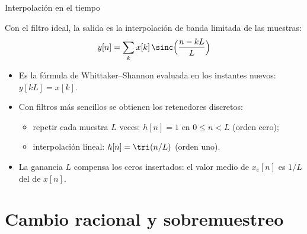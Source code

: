 \documentclass[aspectratio=169,11pt]{beamer}
\begin{document}
\begin{frame}{Interpolación en el tiempo}
  \begin{center}
  \end{center}
  Con el filtro ideal, la salida es la interpolación de banda limitada de las muestras:
  \[
    y[n]=\sum_{k}x[k]\,\sinc\Big(\frac{n-kL}{L}\Big)
  \]
  \begin{itemize}
    \item Es la fórmula de Whittaker--Shannon evaluada en los instantes nuevos: $y[kL]=x[k]$.
    \item Con filtros más sencillos se obtienen los retenedores discretos:
    \begin{itemize}
      \item repetir cada muestra $L$ veces: $h[n]=1$ en $0\le n<L$ (orden cero);
      \item interpolación lineal: $h[n]=\tri(n/L)$ (orden uno).
    \end{itemize}
    \item La ganancia $L$ compensa los ceros insertados: el valor medio de $x_e[n]$ es $1/L$ del de $x[n]$.
  \end{itemize}
\end{frame}

\section{Cambio racional y sobremuestreo}
\end{document}
